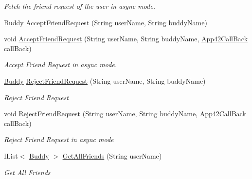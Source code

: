 \begin{DoxyCompactItemize}
\begin{DoxyCompactList}\small\item\em Fetch the friend request of the user in async mode. \end{DoxyCompactList}\item 
\hyperlink{classcom_1_1shephertz_1_1app42_1_1paas_1_1sdk_1_1csharp_1_1buddy_1_1_buddy}{Buddy} \hyperlink{classcom_1_1shephertz_1_1app42_1_1paas_1_1sdk_1_1csharp_1_1buddy_1_1_buddy_service_ac87657a236fde2437de03606a1ca9af9}{Accept\+Friend\+Request} (String user\+Name, String buddy\+Name)
\item 
void \hyperlink{classcom_1_1shephertz_1_1app42_1_1paas_1_1sdk_1_1csharp_1_1buddy_1_1_buddy_service_a49d3221bc877731c493f9d7940d5244c}{Accept\+Friend\+Request} (String user\+Name, String buddy\+Name, \hyperlink{interfacecom_1_1shephertz_1_1app42_1_1paas_1_1sdk_1_1csharp_1_1_app42_call_back}{App42\+Call\+Back} call\+Back)
\begin{DoxyCompactList}\small\item\em Accept Friend Request in async mode. \end{DoxyCompactList}\item 
\hyperlink{classcom_1_1shephertz_1_1app42_1_1paas_1_1sdk_1_1csharp_1_1buddy_1_1_buddy}{Buddy} \hyperlink{classcom_1_1shephertz_1_1app42_1_1paas_1_1sdk_1_1csharp_1_1buddy_1_1_buddy_service_a72c7541c29e46574ee57ba95507d514f}{Reject\+Friend\+Request} (String user\+Name, String buddy\+Name)
\begin{DoxyCompactList}\small\item\em Reject Friend Request \end{DoxyCompactList}\item 
void \hyperlink{classcom_1_1shephertz_1_1app42_1_1paas_1_1sdk_1_1csharp_1_1buddy_1_1_buddy_service_a2a46cd98f5d5e989d8beac76c6c767fe}{Reject\+Friend\+Request} (String user\+Name, String buddy\+Name, \hyperlink{interfacecom_1_1shephertz_1_1app42_1_1paas_1_1sdk_1_1csharp_1_1_app42_call_back}{App42\+Call\+Back} call\+Back)
\begin{DoxyCompactList}\small\item\em Reject Friend Request in async mode \end{DoxyCompactList}\item 
I\+List$<$ \hyperlink{classcom_1_1shephertz_1_1app42_1_1paas_1_1sdk_1_1csharp_1_1buddy_1_1_buddy}{Buddy} $>$ \hyperlink{classcom_1_1shephertz_1_1app42_1_1paas_1_1sdk_1_1csharp_1_1buddy_1_1_buddy_service_a92267bd1c358a3374c2fc6751346ff93}{Get\+All\+Friends} (String user\+Name)
\begin{DoxyCompactList}\small\item\em Get All Friends \end{DoxyCompactList}\item 

\end{DoxyCompactItemize}
